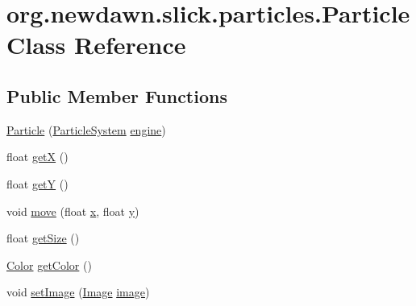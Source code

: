 \hypertarget{classorg_1_1newdawn_1_1slick_1_1particles_1_1_particle}{}\section{org.\+newdawn.\+slick.\+particles.\+Particle Class Reference}
\label{classorg_1_1newdawn_1_1slick_1_1particles_1_1_particle}
\subsection*{Public Member Functions}
\begin{DoxyCompactItemize}
\item 
\mbox{\hyperlink{classorg_1_1newdawn_1_1slick_1_1particles_1_1_particle_a595d749220aa0e954debb9b464194900}{Particle}} (\mbox{\hyperlink{classorg_1_1newdawn_1_1slick_1_1particles_1_1_particle_system}{Particle\+System}} \mbox{\hyperlink{classorg_1_1newdawn_1_1slick_1_1particles_1_1_particle_a92d857a3e2fba0ed564ad8e29ca3b81e}{engine}})
\item 
float \mbox{\hyperlink{classorg_1_1newdawn_1_1slick_1_1particles_1_1_particle_a5727ef74421d30a3161ebe84c62fd777}{getX}} ()
\item 
float \mbox{\hyperlink{classorg_1_1newdawn_1_1slick_1_1particles_1_1_particle_a3d98bf8b855c83c16a4bbab74ce3041d}{getY}} ()
\item 
void \mbox{\hyperlink{classorg_1_1newdawn_1_1slick_1_1particles_1_1_particle_a595740fdaba4843ae46e9b7ca5d2e5ba}{move}} (float \mbox{\hyperlink{classorg_1_1newdawn_1_1slick_1_1particles_1_1_particle_ae1ee7d5a72b34bbdb44110dfa2795674}{x}}, float \mbox{\hyperlink{classorg_1_1newdawn_1_1slick_1_1particles_1_1_particle_ad784e37c1fdad77abc886521b8e907b2}{y}})
\item 
float \mbox{\hyperlink{classorg_1_1newdawn_1_1slick_1_1particles_1_1_particle_ab305952235946ee59244bb1edfb8c703}{get\+Size}} ()
\item 
\mbox{\hyperlink{classorg_1_1newdawn_1_1slick_1_1_color}{Color}} \mbox{\hyperlink{classorg_1_1newdawn_1_1slick_1_1particles_1_1_particle_ac25b53b99465bc6e52de1dc5a24121c4}{get\+Color}} ()
\item 
void \mbox{\hyperlink{classorg_1_1newdawn_1_1slick_1_1particles_1_1_particle_ace026fbacd1cfab42f5c58e8b4283015}{set\+Image}} (\mbox{\hyperlink{classorg_1_1newdawn_1_1slick_1_1_image}{Image}} \mbox{\hyperlink{classorg_1_1newdawn_1_1slick_1_1particles_1_1_particle_a1d154fcb0fa4f99035f4faff21919ec9}{image}})

\end{DoxyCompactItemize}
